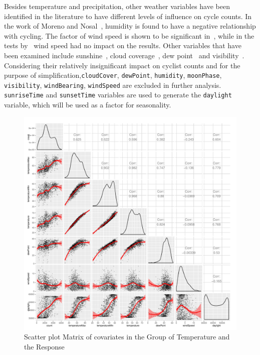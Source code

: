 \documentclass [11pt, proquest] {uwthesis}[2015/03/03]
\begin{document}
Besides temperature and precipitation, other weather variables have been identified in the literature to have different levels of influence on cycle counts. In the work of Moreno and Nosal~\cite{Miranda-Moreno:2011aa}, humidity is found to have a negative relationship with cycling. The factor of wind speed is shown to be significant in~\cite{Thomas12}, while in the tests by~\cite{Miranda-Moreno:2011aa} wind speed had no impact on the results. Other variables that have been examined include sunshine~\cite{Thomas12}, cloud coverage~\cite{Hanson77}, dew point~\cite{Schade14,Nosal:2014aa} and visibility~\cite{Thomas09}. Considering their relatively insignificant impact on cyclist counts and for the purpose of simplification,\texttt{cloudCover}, \texttt{dewPoint}, \texttt{humidity}, \texttt{moonPhase}, \texttt{visibility}, \texttt{windBearing}, \texttt{windSpeed} are excluded in further analysis. \texttt{sunriseTime} and \texttt{sunsetTime} variables are used to generate the \texttt{daylight} variable, which will be used as a factor for seasonality.

\begin{figure}
  \includegraphics[width=1\textwidth]{figures/matrix2}
  \caption{Scatter plot Matrix of covariates in the Group of Temperature and the Response}
  \label{fig:temp_corr}
\end{figure}
\end{document}
